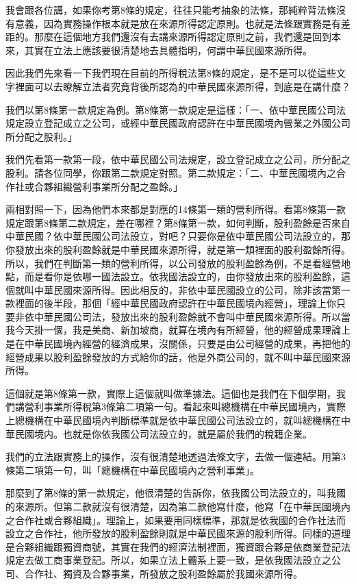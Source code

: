 \documentclass[oneside,sub3section]{ctexbook}
\begin{document}
我會跟各位講，如果你考第8條的規定，往往只能考抽象的法條，那純粹背法條沒有意義，因為實務操作根本就是放在來源所得認定原則。也就是法條跟實務是有差距的。那麼在這個地方我們還沒有去講來源所得認定原則之前，我們還是回到本來，其實在立法上應該要很清楚地去具體指明，何謂中華民國來源所得。

因此我們先來看一下我們現在目前的所得稅法第8條的規定，是不是可以從這些文字裡面可以去瞭解立法者究竟背後所認為的中華民國來源所得，到底是在講什麼？

我們以第8條第一款規定為例。第8條第一款規定是這樣：「一、依中華民國公司法規定設立登記成立之公司，或經中華民國政府認許在中華民國境內營業之外國公司所分配之股利。」

我們先看第一款第一段，依中華民國公司法規定，設立登記成立之公司，所分配之股利。請各位同學，你跟第二款規定對照。第二款規定：「二、中華民國境內之合作社或合夥組織營利事業所分配之盈餘。」

兩相對照一下，因為他們本來都是對應的14條第一類的營利所得。看第8條第一款規定跟第8條第二款規定，差在哪裡？第8條第一款，如何判斷，股利盈餘是否來自中華民國？依中華民國公司法設立，對吧？只要你是依中華民國公司法設立的，那你發放出來的股利盈餘就是中華民國來源所得，就是第一類裡面的股利盈餘所得。所以，我們在判斷第一類的營利所得，以公司發放的股利盈餘為例，不是看經營地點，而是看你是依哪一國法設立。依我國法設立的，由你發放出來的股利盈餘，這個就叫中華民國來源所得。因此相反的，非依中華民國設立的公司，除非該當第一款裡面的後半段，那個「經中華民國政府認許在中華民國境內經營」，理論上你只要非依中華民國公司法，發放出來的股利盈餘就不會叫中華民國來源所得。所以當我今天掛一個，我是美商、新加坡商，就算在境內有所經營，他的經營成果理論上是在中華民國境內經營的經濟成果，沒關係，只要是由公司經營的成果，再把他的經營成果以股利盈餘發放的方式給你的話，他是外商公司的，就不叫中華民國來源所得。

這個就是第8條第一款，實際上這個就叫做準據法。這個也是我們在下個學期，我們講營利事業所得稅第3條第二項第一句。看起來叫總機構在中華民國境內，實際上總機構在中華民國境內判斷標準就是依中華民國公司法設立的，就叫總機構在中華民國境内。也就是你依我國公司法設立的，就是屬於我們的稅籍企業。

我們的立法跟實務上的操作，沒有很清楚地透過法條文字，去做一個連結。用第3條第二項第一句，叫「總機構在中華民國境內之營利事業」。

那麼到了第8條的第一款規定，他很清楚的告訴你，依我國公司法設立的，叫我國的來源所。但第二款就沒有很清楚，因為第二款他寫什麼，他寫「在中華民國境內之合作社或合夥組織」。理論上，如果要用同樣標準，那就是依我國的合作社法而設立之合作社，他所發放的股利盈餘則就是中華民國來源的股利所得。同樣的道理是合夥組織跟獨資商號，其實在我們的經濟法制裡面，獨資跟合夥是依商業登記法規定去做工商事業登記。所以，如果立法上體系上要一致，是依我國法設立之公司、合作社、獨資及合夥事業，所發放之股利盈餘屬於我國來源所得。
\end{document}
